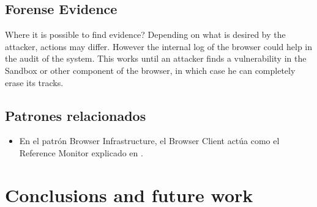 \documentclass{sig-alternate-05-2015}
\begin{document}
\subsection{Forense Evidence}
  Where it is possible to find evidence? Depending on what is desired by the attacker, actions may differ. However the internal log of the browser could help in the audit of the system. This works until an attacker finds a vulnerability in the Sandbox or other component of the browser, in which case he can completely erase its tracks.

\subsection{Patrones relacionados}
  \begin{itemize}
    \item En el patrón Browser Infrastructure, el Browser Client actúa como el Reference Monitor explicado en \cite{fernandez2001pattern}.
  \end{itemize}


\section*{Conclusions and future work}


\end{document}
